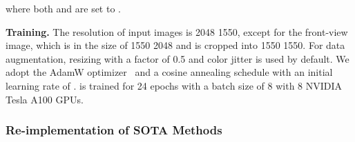 where both  and  are set to . 



\smallskip
\noindent
\textbf{Training.}
The resolution of input images is 2048  1550, except for the front-view image, which is in the size of 1550  2048 and is cropped into 1550  1550.
For data augmentation, resizing with a factor of 0.5 and color jitter is used by default.
We adopt the AdamW optimizer~\cite{adamw} and a cosine annealing schedule with an initial learning rate of . \algname is trained for 24 epochs with a batch size of 8 with 8 NVIDIA Tesla A100 GPUs.


\subsubsection{Re-implementation of SOTA Methods}

